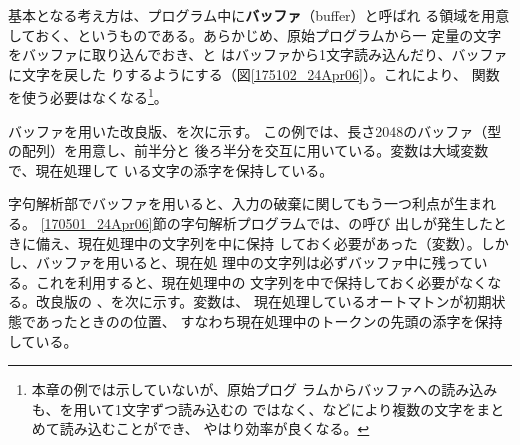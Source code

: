 基本となる考え方は、プログラム中に{\bfseries バッファ}（buffer）と呼ばれ
る領域を用意しておく、というものである。あらかじめ、原始プログラムから一
定量の文字をバッファに取り込んでおき、と
はバッファから1文字読み込んだり、バッファに文字を戻した
りするようにする（図\ref{175102_24Apr06}）。これにより、
関数を使う必要はなくなる\footnote{本章の例では示していないが、原始プログ
ラムからバッファへの読み込みも、を用いて1文字ずつ読み込むの
ではなく、などにより複数の文字をまとめて読み込むことができ、
やはり効率が良くなる。}。

バッファを用いた改良版、を次に示す。
この例では、長さ2048のバッファ（型の配列）を用意し、前半分と
後ろ半分を交互に用いている。変数は大域変数で、現在処理して
いる文字の添字を保持している。

\begin{quote}
 
\end{quote}

字句解析部でバッファを用いると、入力の破棄に関してもう一つ利点が生まれる。
\ref{170501_24Apr06}節の字句解析プログラムでは、の呼び
出しが発生したときに備え、現在処理中の文字列を中に保持
しておく必要があった（変数）。しかし、バッファを用いると、現在処
理中の文字列は必ずバッファ中に残っている。これを利用すると、現在処理中の
文字列を中で保持しておく必要がなくなる。改良版の
、を次に示す。変数は、
現在処理しているオートマトンが初期状態であったときのの位置、
すなわち現在処理中のトークンの先頭の添字を保持している。

\begin{quote}
 
\end{quote}
